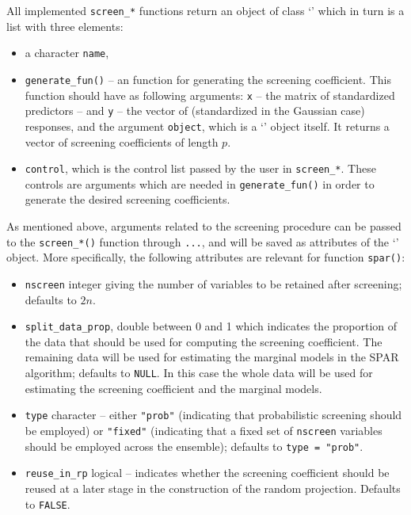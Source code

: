 \documentclass[
  article,
  nojss]{jss}
\newcommand{\class}[1]{`\code{#1}'}
\begin{document}
All implemented \texttt{screen\_*} functions return an object of class
\class{screencoef} which in turn is a list with three elements:

\begin{itemize}
\item
  a character \texttt{name},
\item
  \texttt{generate\_fun()} -- an  function for generating
  the screening coefficient. This function should have as following
  arguments: \texttt{x} -- the matrix of standardized predictors -- and
  \texttt{y} -- the vector of (standardized in the Gaussian case)
  responses, and the argument \texttt{object}, which is a
  \class{screencoef} object itself. It returns a vector of screening
  coefficients of length \(p\).
\item
  \texttt{control}, which is the control list passed by the user in
  \texttt{screen\_*}. These controls are arguments which are needed in
  \texttt{generate\_fun()} in order to generate the desired screening
  coefficients.
\end{itemize}

As mentioned above, arguments related to the screening procedure can be
passed to the \texttt{screen\_*()} function through \texttt{...}, and
will be saved as attributes of the \class{screencoef} object. More
specifically, the following attributes are relevant for function
\texttt{spar()}:

\begin{itemize}
\item
  \texttt{nscreen} integer giving the number of variables to be retained
  after screening; defaults to \(2n\).
\item
  \texttt{split\_data\_prop}, double between 0 and 1 which indicates the
  proportion of the data that should be used for computing the screening
  coefficient. The remaining data will be used for estimating the
  marginal models in the SPAR algorithm; defaults to \texttt{NULL}. In
  this case the whole data will be used for estimating the screening
  coefficient and the marginal models.
\item
  \texttt{type} character -- either \texttt{"prob"} (indicating that
  probabilistic screening should be employed) or \texttt{"fixed"}
  (indicating that a fixed set of \texttt{nscreen} variables should be
  employed across the ensemble); defaults to \texttt{type\ =\ "prob"}.
\item
  \texttt{reuse\_in\_rp} logical -- indicates whether the screening
  coefficient should be reused at a later stage in the construction of
  the random projection. Defaults to \texttt{FALSE}.
\end{itemize}
\end{document}
